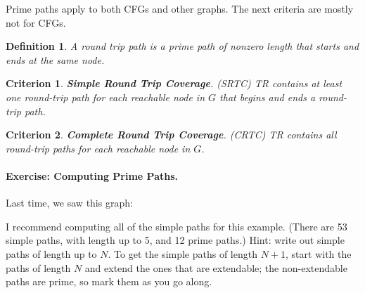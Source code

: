 \documentclass[11pt]{article}
\newtheorem{defn}{Definition}
\newtheorem{crit}{Criterion}
\begin{document}
Prime paths apply to both CFGs and other graphs. The next criteria
are mostly not for CFGs.
\begin{defn}
A \emph{round trip} path is a prime path of nonzero length that starts
and ends at the same node.
\end{defn}

\begin{crit}
{\bf Simple Round Trip Coverage}. (SRTC) \emph{TR} contains at least one
round-trip path for each reachable node in $G$ that begins and ends a
round-trip path.
\end{crit}

\begin{crit}
{\bf Complete Round Trip Coverage}. (CRTC) \emph{TR} contains all round-trip
paths for each reachable node in $G$.
\end{crit}

\paragraph{Exercise: Computing Prime Paths.}
Last time, we saw this graph:
\begin{center}
\end{center}
I recommend computing all of the simple paths for this example. (There are 53
simple paths, with length up to 5, and 12 prime paths.) Hint: write out
simple paths of length up to $N$. To get the simple paths of length $N+1$,
start with the paths of length $N$ and extend the ones that are extendable;
the non-extendable paths are prime, so mark them as you go along.
\end{document}
